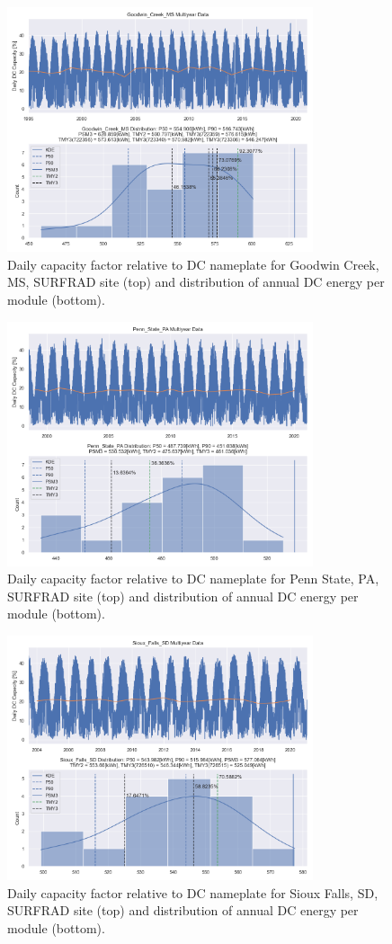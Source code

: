 \documentclass[conference]{IEEEtran}
\begin{document}
\begin{figure}[htbp]
\centerline{\includegraphics[width=9cm]{Goodwin_Creek_MS.png}}
\caption{Daily capacity factor relative to DC nameplate for Goodwin Creek, MS, SURFRAD site (top) and distribution of annual DC energy per module (bottom).}
\label{fig:Goodwin-Creek-MS}
\end{figure}

\begin{figure}[htbp]
\centerline{\includegraphics[width=9cm]{Penn_State_PA.png}}
\caption{Daily capacity factor relative to DC nameplate for Penn State, PA, SURFRAD site (top) and distribution of annual DC energy per module (bottom).}
\label{fig:Penn-State-PA}
\end{figure}

\begin{figure}[htbp]
\centerline{\includegraphics[width=9cm]{Sioux_Falls_SD.png}}
\caption{Daily capacity factor relative to DC nameplate for Sioux Falls, SD, SURFRAD site (top) and distribution of annual DC energy per module (bottom).}
\label{fig:Sioux-Falls-SD}
\end{figure}
\end{document}
